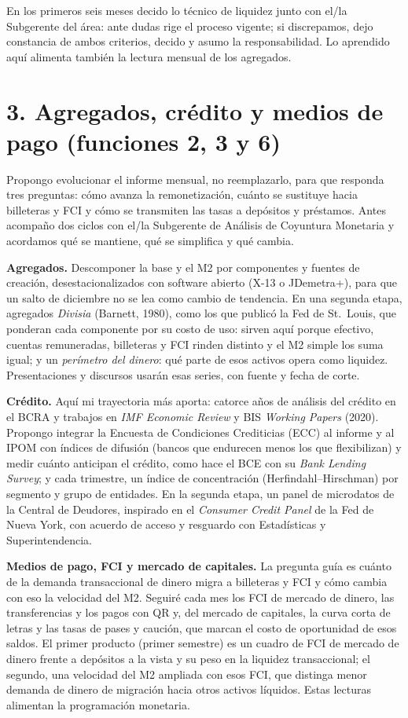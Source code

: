 \documentclass[11pt,a4paper]{article}
\begin{document}
En los primeros seis meses decido lo técnico de liquidez junto con el/la Subgerente del área: ante dudas rige el proceso vigente; si discrepamos, dejo constancia de ambos criterios, decido y asumo la responsabilidad. Lo aprendido aquí alimenta también la lectura mensual de los agregados.

\section*{3. Agregados, crédito y medios de pago (funciones 2, 3 y 6)}
Propongo evolucionar el informe mensual, no reemplazarlo, para que responda tres preguntas: cómo avanza la remonetización, cuánto se sustituye hacia billeteras y FCI y cómo se transmiten las tasas a depósitos y préstamos. Antes acompaño dos ciclos con el/la Subgerente de Análisis de Coyuntura Monetaria y acordamos qué se mantiene, qué se simplifica y qué cambia.

\textbf{Agregados.} Descomponer la base y el M2 por componentes y fuentes de creación, desestacionalizados con software abierto (X-13 o JDemetra+), para que un salto de diciembre no se lea como cambio de tendencia. En una segunda etapa, agregados \emph{Divisia} (Barnett, 1980), como los que publicó la Fed de St.~Louis, que ponderan cada componente por su costo de uso: sirven aquí porque efectivo, cuentas remuneradas, billeteras y FCI rinden distinto y el M2 simple los suma igual; y un \emph{perímetro del dinero}: qué parte de esos activos opera como liquidez. Presentaciones y discursos usarán esas series, con fuente y fecha de corte.

\textbf{Crédito.} Aquí mi trayectoria más aporta: catorce años de análisis del crédito en el BCRA y trabajos en \emph{IMF Economic Review} y BIS \emph{Working Papers} (2020). Propongo integrar la Encuesta de Condiciones Crediticias (ECC) al informe y al IPOM con índices de difusión (bancos que endurecen menos los que flexibilizan) y medir cuánto anticipan el crédito, como hace el BCE con su \emph{Bank Lending Survey}; y cada trimestre, un índice de concentración (Herfindahl--Hirschman) por segmento y grupo de entidades. En la segunda etapa, un panel de microdatos de la Central de Deudores, inspirado en el \emph{Consumer Credit Panel} de la Fed de Nueva York, con acuerdo de acceso y resguardo con Estadísticas y Superintendencia.

\textbf{Medios de pago, FCI y mercado de capitales.} La pregunta guía es cuánto de la demanda transaccional de dinero migra a billeteras y FCI y cómo cambia con eso la velocidad del M2. Seguiré cada mes los FCI de mercado de dinero, las transferencias y los pagos con QR y, del mercado de capitales, la curva corta de letras y las tasas de pases y caución, que marcan el costo de oportunidad de esos saldos. El primer producto (primer semestre) es un cuadro de FCI de mercado de dinero frente a depósitos a la vista y su peso en la liquidez transaccional; el segundo, una velocidad del M2 ampliada con esos FCI, que distinga menor demanda de dinero de migración hacia otros activos líquidos. Estas lecturas alimentan la programación monetaria.
\end{document}
